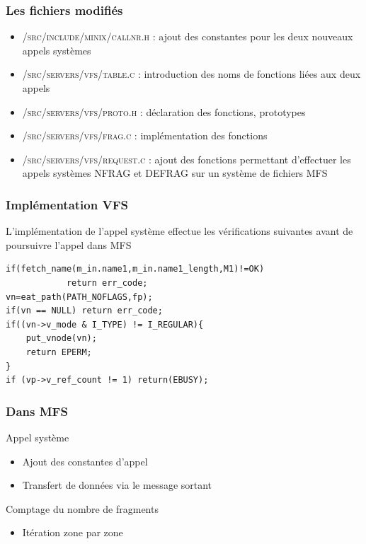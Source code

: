 \documentclass[handout]{beamer}
\begin{document}
\begin{frame}
\frametitle{Les fichiers modifiés}
\begin{itemize}
\item \textsc{/src/include/minix/callnr.h} : ajout des constantes pour les deux nouveaux appels systèmes
\item \textsc{/src/servers/vfs/table.c} : introduction des noms de fonctions liées aux deux appels
\item \textsc{/src/servers/vfs/proto.h} : déclaration des fonctions, prototypes
\item \textsc{/src/servers/vfs/frag.c} : implémentation des fonctions
\item \textsc{/src/servers/vfs/request.c} : ajout des fonctions permettant d'effectuer les appels systèmes NFRAG et DEFRAG sur un système de fichiers MFS
\end{itemize}
\end{frame}


\begin{frame}[fragile]
\frametitle{Implémentation VFS}
\begin{block}{L'implémentation de l'appel système effectue les vérifications suivantes avant de poursuivre l'appel dans MFS}
\begin{lstlisting} 
if(fetch_name(m_in.name1,m_in.name1_length,M1)!=OK)
	    	return err_code; 
vn=eat_path(PATH_NOFLAGS,fp); 
if(vn == NULL) return err_code; 
if((vn->v_mode & I_TYPE) != I_REGULAR){
	put_vnode(vn);
	return EPERM; 
}
if (vp->v_ref_count != 1) return(EBUSY);
\end{lstlisting}
\end{block}
\end{frame}


\begin{frame}
\frametitle{Dans MFS}
\begin{block} {Appel système}
\begin{itemize}
\item Ajout des constantes d'appel
\item Transfert de données via le message sortant
\end{itemize}
\end{block}
\begin{block}{Comptage du nombre de fragments}
\begin{itemize}
\item Itération zone par zone
\end{itemize}
\end{block}
\end{frame}
\end{document}
